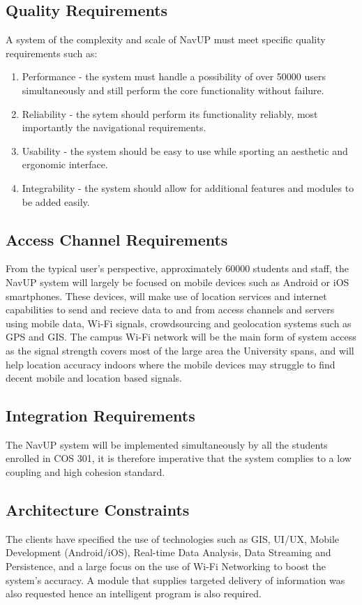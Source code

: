 \documentclass[11pt, a4paper]{article}
\begin{document}
	\subsection{Quality Requirements}
				A system of the complexity and scale of NavUP must meet specific quality requirements such as:
				
				\begin{enumerate}
				\renewcommand{\labelenumi}{{\textbf{\arabic{enumi}.}}}
				\item Performance - the system must handle a possibility of over 50000 users simultaneously and still perform the core functionality without failure.
				\item Reliability - the sytem should perform its functionality reliably,  most importantly the navigational requirements.
				\item Usability - the system should be easy to use while sporting an aesthetic and ergonomic interface.
				\item Integrability - the system should allow for additional features and modules to be added easily.
				\end{enumerate}
				

			\subsection{Access Channel Requirements}
				From the typical user's perspective,  approximately 60000 students and staff,  the NavUP system will largely be focused on mobile devices such as Android or iOS smartphones.
				These devices,  will make use of location services and internet capabilities to send and recieve data to and from access channels and servers using mobile data, 
				Wi-Fi signals,  crowdsourcing and geolocation systems such as GPS and GIS. The campus Wi-Fi network will be the main form of system access as the signal
				strength covers most of the large area the University spans,  and will help location accuracy indoors where the mobile devices may struggle to find decent mobile
				and location based signals.

			
			\subsection{Integration Requirements}
				The NavUP system will be implemented simultaneously by all the students enrolled in COS 301,  it is therefore imperative that the system complies to a low coupling and high cohesion standard.
			\subsection{Architecture Constraints}
				The clients have specified the use of technologies such as GIS,  UI/UX,  Mobile Development (Android/iOS),   Real-time Data Analysis,  Data Streaming and
				Persistence,  and a large focus on the use of Wi-Fi Networking to boost the system's accuracy. A module that supplies targeted delivery of information was also requested hence an intelligent program is also required.
				
\end{document}
